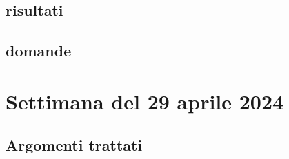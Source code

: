 \documentclass{article}
\begin{document}
\subsection{risultati}

\subsection{domande}

\section{Settimana del 29 aprile 2024}

\subsection{Argomenti trattati}
\end{document}
